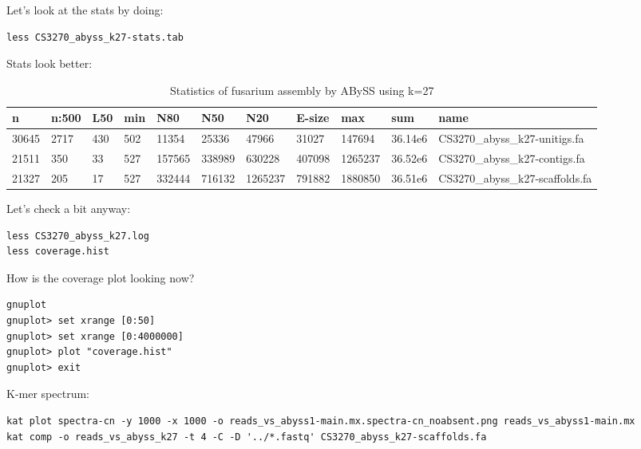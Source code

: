 \begin{steps}
Let's look at the stats by doing:
\begin{lstlisting}
less CS3270_abyss_k27-stats.tab
\end{lstlisting}
\end{steps}

Stats look better:
\begin{table}[H]
\small
  \centering
  \caption{Statistics of fusarium assembly by ABySS using k=27}
    \begin{tabular}{lllllllllll}
    \toprule
    \textbf{n} & \textbf{n:500} & \textbf{L50} & \textbf{min} & \textbf{N80}& \textbf{N50}& \textbf{N20}& \textbf{E-size}& \textbf{max} & \textbf{sum}& \textbf{name}\\
    \midrule
    30645  & 2717   & 430  & 502  & 11354   & 25336   & 47966    & 31027   & 147694   & 36.14e6  & CS3270\_abyss\_k27-unitigs.fa \\
	21511  & 350    & 33   & 527  & 157565  & 338989  & 630228   & 407098  & 1265237  & 36.52e6  & CS3270\_abyss\_k27-contigs.fa \\
	21327  & 205    & 17   & 527  & 332444  & 716132  & 1265237  & 791882  & 1880850  & 36.51e6  & CS3270\_abyss\_k27-scaffolds.fa \\
    \bottomrule
    \end{tabular}
  \label{tab:fusariumk27}
\end{table}

\begin{steps}
Let's check a bit anyway:
\begin{lstlisting}
less CS3270_abyss_k27.log
less coverage.hist
\end{lstlisting}
\end{steps}

\begin{steps}
How is the coverage plot looking now?
\begin{lstlisting}
gnuplot
gnuplot> set xrange [0:50]
gnuplot> set xrange [0:4000000]
gnuplot> plot "coverage.hist"
gnuplot> exit
\end{lstlisting}
\end{steps}

\begin{steps}
K-mer spectrum:
\begin{lstlisting}
kat plot spectra-cn -y 1000 -x 1000 -o reads_vs_abyss1-main.mx.spectra-cn_noabsent.png reads_vs_abyss1-main.mx
kat comp -o reads_vs_abyss_k27 -t 4 -C -D '../*.fastq' CS3270_abyss_k27-scaffolds.fa
\end{lstlisting}
\end{steps}

